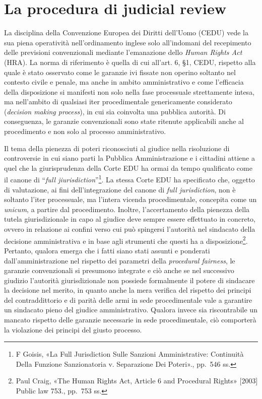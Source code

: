 \documentclass[12pt,it,a4paper,]{report}
\begin{document}
\hypertarget{la-procedura-di-judicial-review}{%
\section{La procedura di judicial
review}\label{la-procedura-di-judicial-review}}

La disciplina della Convenzione Europea dei Diritti dell'Uomo (CEDU)
vede la sua piena operatività nell'ordinamento inglese solo all'indomani
del recepimento delle previsioni convenzionali mediante l'emanazione
dello \emph{Human Rights Act} (HRA). La norma di riferimento è quella di
cui all'art. 6, §1, CEDU, rispetto alla quale è stato osservato come le
garanzie ivi fissate non operino soltanto nel contesto civile e penale,
ma anche in ambito amministrativo e come l'efficacia della disposizione
si manifesti non solo nella fase processuale strettamente intesa, ma
nell'ambito di qualsiasi iter procedimentale genericamente considerato
(\emph{decision making process}), in cui sia coinvolta una pubblica
autorità. Di conseguenza, le garanzie convenzionali sono state ritenute
applicabili anche al procedimento e non solo al processo amministrativo.

Il tema della pienezza di poteri riconosciuti al giudice nella
risoluzione di controversie in cui siano parti la Pubblica
Amministrazione e i cittadini attiene a quel che la giurisprudenza della
Corte EDU ha ormai da tempo qualificato come il canone di ``\emph{full
jiurisdiction}''\footnote{{F Goisis, {«La Full Jurisdiction Sulle
  Sanzioni Amministrative: Continuità Della Funzione Sanzionatoria v.
  Separazione Dei Poteri»}.}, pp.~546 ss.}. La stessa Corte EDU ha
specificato che, oggetto di valutazione, ai fini dell'integrazione del
canone di \emph{full jurisdiction}, non è soltanto l'iter processuale,
ma l'intera vicenda procedimentale, concepita come un \emph{unicum}, a
partire dal procedimento. Inoltre, l'accertamento della pienezza della
tutela giurisdizionale in capo al giudice deve sempre essere effettuato
in concreto, ovvero in relazione ai confini verso cui può spingersi
l'autorità nel sindacato della decisione amministrativa e in base agli
strumenti che questi ha a disposizione\footnote{{Paul Craig, {«The Human
  Rights Act, Article 6 and Procedural Rights»} {[}2003{]} Public law
  753.}, pp.~753 ss.}. Pertanto, qualora emerga che i fatti siano stati
assunti e ponderati dall'amministrazione nel rispetto dei parametri
della \emph{procedural fairness}, le garanzie convenzionali si presumono
integrate e ciò anche se nel successivo giudizio l'autorità
giurisdizionale non possiede formalmente il potere di sindacare la
decisione nel merito, in quanto anche la mera verifica del rispetto dei
principi del contraddittorio e di parità delle armi in sede
procedimentale vale a garantire un sindacato pieno del giudice
amministrativo. Qualora invece sia riscontrabile un mancato rispetto
delle garanzie necessarie in sede procedimentale, ciò comporterà la
violazione dei principi del giusto processo.
\end{document}

